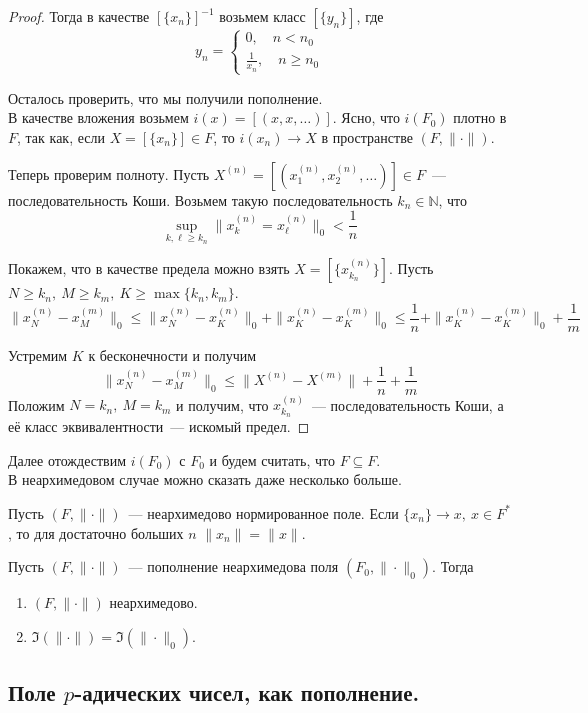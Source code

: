 \documentclass[11pt]{article}
\begin{document}
\begin{proof}
        Тогда в качестве $[\{ x_n \}]^{-1}$ возьмем класс $[\{ y_n \}]$, где
        \[ y_n = \begin{cases} 0,\quad n < n_0 \\ \frac{1}{x_n}, \quad n \ge n_0 \end{cases}\]

        Осталось проверить, что мы получили пополнение. \\
        В качестве вложения возьмем $i(x) = [(x, x, \ldots)]$. Ясно, что $i(F_0)$ плотно в $F$, так как, если
        $X = [\{ x_n \}] \in F$, то $i(x_n) \to X$ в пространстве $(F, \| \cdot \| )$.

        Теперь проверим полноту. Пусть $X^{(n)} = [( x_1^{(n)}, x_2^{(n)}, \ldots ) ] \in F$~--- последовательность Коши.
        Возьмем такую последовательность $k_n \in \mathbb{N}$, что
        \[ \sup\limits_{k, \ell \ge k_n} \| x_k^{(n)} = x_{\ell}^{(n)}\|_0 < \frac{1}{n} \]

        Покажем, что в качестве предела можно взять $X = [ \{ x_{k_n}^{(n)} \}]$. Пусть $N \ge k_n, \ M \ge k_m, \ K \ge \max\{ k_n, k_m \}$.
        \[ \| x_N^{(n)} - x_M^{(m)}\|_0 \le \| x_N^{(n)} - x_K^{(n)}\|_0 + \| x_K^{(n)} - x_K^{(m)}\|_0 \le \frac{1}{n} + \| x_K^{(n)} - x_K^{(m)}\|_0 + \frac{1}{m} \]

        Устремим $K$ к бесконечности и получим
        \[ \| x_N^{(n)} - x_M^{(m)} \|_0 \le \| X^{(n)} - X^{(m)}\| + \frac{1}{n} + \frac{1}{m} \]
        Положим $N = k_{n}, \ M = k_m$ и получим, что $x_{k_n}^{(n)}$~--- последовательность Коши, а её класс эквивалентности~--- искомый предел.
    \end{proof}

    Далее отождествим $i(F_0)$ с $F_0$ и будем считать, что $F \subseteq F$.\\

    В неархимедовом случае можно сказать даже несколько больше.

   Пусть $(F, \| \cdot \|)$~--- неархимедово нормированное поле. Если  $\{ x_n \} \to x, \ x \in F^{*}$, то для достаточно больших
    $n$ $\| x_n \| = \| x \|$.

   \begin{lemma}
       Пусть $(F, \| \cdot \|)$~--- пополнение неархимедова поля $(F_0, \| \cdot \|_0)$. Тогда
       \begin{enumerate}
           \item $(F, \| \cdot \|)$ неархимедово.

           \item $\Im(\| \cdot \|) = \Im(\| \cdot \|_0)$.
       \end{enumerate}
   \end{lemma}

   \subsection{Поле $p$-адических чисел, как пополнение.}
\end{document}
